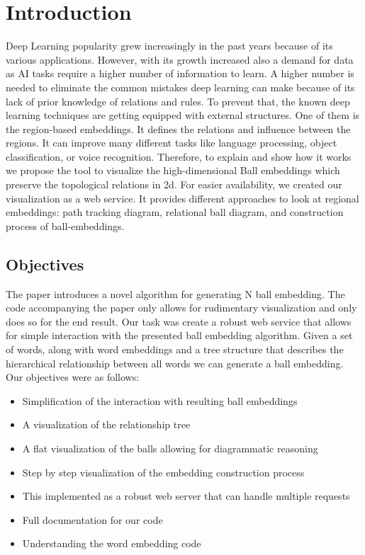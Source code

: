 \chapter{Introduction}
Deep Learning popularity grew increasingly in the past years because of its various applications. However, with its growth increased also a demand for data as AI tasks require a higher number of information to learn. A higher number is needed to eliminate the common mistakes deep learning can make because of its lack of prior knowledge of relations and rules. To prevent that, the known deep learning techniques are getting equipped with external structures. One of them is the region-based embeddings. It defines the relations and influence between the regions. It can improve many different tasks like language processing, object classification, or voice recognition. Therefore, to explain and show how it works we propose the tool to visualize the high-dimensional Ball embeddings which preserve the topological relations in 2d. For easier availability, we created our visualization as a web service. It provides different approaches to look at regional embeddings: path tracking diagram, relational ball diagram, and construction process of ball-embeddings.

\section{Objectives}
\label{objectives}
The paper \cite{dong2018encoding} introduces a novel algorithm for generating N ball embedding. The code accompanying the paper only allows for rudimentary visualization and only does so for the end result. Our task was create a robust web service that allows for simple interaction with the presented ball embedding algorithm. 
Given a set of words, along with word embeddings and a tree structure that describes the hierarchical relationship between all words we can generate a ball embedding. \\

Our objectives were as follows:
\begin{itemize}
	\item Simplification of the interaction with resulting ball embeddings
	\item A visualization of the relationship tree
	\item A flat visualization of the balls allowing for diagrammatic reasoning
	\item Step by step visualization of the embedding construction process
	\item This implemented as a robust web server that can handle multiple requests
	\item Full documentation for our code
	\item Understanding the word embedding code
\end{itemize}


